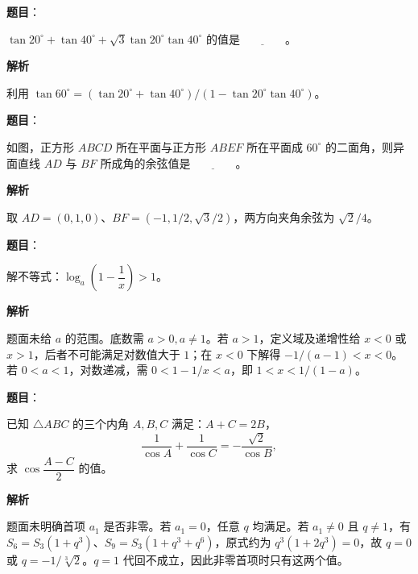 \begin{answer}

\textbf{题目}：

$\tan20^\circ+\tan40^\circ+\sqrt{3}\tan20^\circ\tan40^\circ$ 的值是$\underline{\qquad\qquad}$。

\textbf{解析}

利用 $\tan60^\circ=(\tan20^\circ+\tan40^\circ)/(1-\tan20^\circ\tan40^\circ)$。


\end{answer}
\begin{answer}

\textbf{题目}：

如图，正方形 $ABCD$ 所在平面与正方形 $ABEF$ 所在平面成 $60^\circ$ 的二面角，则异面直线 $AD$ 与 $BF$ 所成角的余弦值是$\underline{\qquad\qquad}$。
\nopagebreak[4]
\begin{center}\end{center}
\nopagebreak[4]
\textbf{解析}

取 $AD=(0,1,0)$、$BF=(-1,1/2,\sqrt3/2)$，两方向夹角余弦为 $\sqrt2/4$。


\end{answer}
\begin{answer}

\textbf{题目}：

解不等式：$\log_a\left(1-\dfrac{1}{x}\right)>1$。

\textbf{解析}

题面未给 $a$ 的范围。底数需 $a>0,a\ne1$。若 $a>1$，定义域及递增性给 $x<0$ 或 $x>1$，后者不可能满足对数值大于 $1$；在 $x<0$ 下解得 $-1/(a-1)<x<0$。若 $0<a<1$，对数递减，需 $0<1-1/x<a$，即 $1<x<1/(1-a)$。


\end{answer}
\begin{answer}

\textbf{题目}：

已知 $\triangle ABC$ 的三个内角 $A,B,C$ 满足：$A+C=2B$，
\nopagebreak[4]
\[
\dfrac{1}{\cos A}+\dfrac{1}{\cos C}=-\dfrac{\sqrt{2}}{\cos B},
\]
求 $\cos\dfrac{A-C}{2}$ 的值。

\textbf{解析}

题面未明确首项 $a_1$ 是否非零。若 $a_1=0$，任意 $q$ 均满足。若 $a_1\ne0$ 且 $q\ne1$，有 $S_6=S_3(1+q^3)$、$S_9=S_3(1+q^3+q^6)$，原式约为 $q^3(1+2q^3)=0$，故 $q=0$ 或 $q=-1/\sqrt[3]{2}$。$q=1$ 代回不成立，因此非零首项时只有这两个值。


\end{answer}
